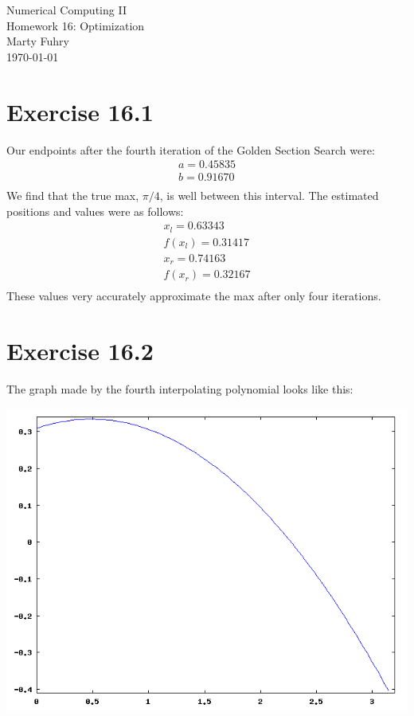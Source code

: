 \documentclass[11pt]{article}
\begin{document}
         
\newcommand{\makehomework}[2]%
{\begin{center}%
	\Huge #1\\%
	\Large #2\\%
	Marty Fuhry\\%
	\today%
\end{center}}
\makehomework{Numerical Computing II}{Homework 16: Optimization}

\section*{Exercise 16.1}

Our endpoints after the fourth iteration of the Golden Section Search were:
	\begin{eqnarray*}
	a = 0.45835 \\
	b = 0.91670 \\
	\end{eqnarray*}
We find that the true max, $\pi/4$, is well between this interval. The estimated positions and values were as follows:
\begin{eqnarray*}
	x_l = 0.63343 \\ f(x_l) = 0.31417 \\
	x_r = 0.74163 \\ f(x_r) = 0.32167 \\
\end{eqnarray*}
These values very accurately approximate the max after only four iterations.
\pagebreak

\section*{Exercise 16.2}


\pagebreak
The graph made by the fourth interpolating polynomial looks like this:

\begin{center}
\includegraphics[scale=0.5]{problem_16_2.png}
\end{center}
\end{document}
